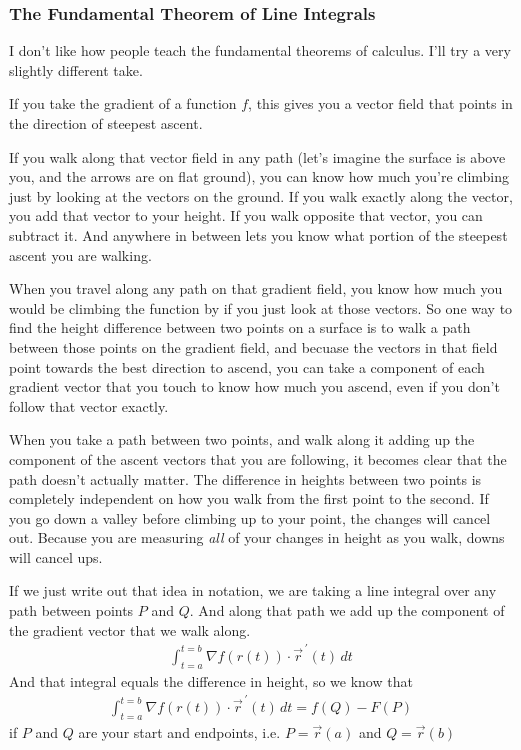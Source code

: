 \documentclass[12pt, letterpaper]{article}
\begin{document}
\subsubsection{The Fundamental Theorem of Line Integrals}
I don't like how people teach the fundamental theorems of calculus.
I'll try a very slightly different take.

If you take the gradient of a function $f$, this gives you a vector field that points in the direction of steepest ascent.

If you walk along that vector field in any path (let's imagine the surface is above you, and the arrows are on flat ground), you can know how much you're climbing just by looking at the vectors on the ground.
If you walk exactly along the vector, you add that vector to your height.
If you walk opposite that vector, you can subtract it.
And anywhere in between lets you know what portion of the steepest ascent you are walking.

When you travel along any path on that gradient field, you know how much you would be climbing the function by if you just look at those vectors.
So one way to find the height difference between two points on a surface is to walk a path between those points on the gradient field,
and becuase the vectors in that field point towards the best direction to ascend, you can take a component of each gradient vector that you touch to know how much you ascend,
even if you don't follow that vector exactly.

When you take a path between two points, and walk along it adding up the component of the ascent vectors that you are following, it becomes clear that the path doesn't actually matter.
The difference in heights between two points is completely independent on how you walk from the first point to the second.
If you go down a valley before climbing up to your point, the changes will cancel out.
Because you are measuring \emph{all} of your changes in height as you walk, downs will cancel ups.

If we just write out that idea in notation, we are taking a line integral over any path between points $P$ and $Q$.
And along that path we add up the component of the gradient vector that we walk along.
\begin{gather*}
    \int_{t=a}^{t=b} \nabla f(r(t)) \cdot \vec{r}^{\,\prime} (t) \, dt
\end{gather*}
And that integral equals the difference in height, so we know that 
\begin{gather*}
    \int_{t=a}^{t=b} \nabla f(r(t)) \cdot \vec{r}^{\,\prime} (t) \, dt = f(Q) - F(P)
\end{gather*}
if $P$ and $Q$ are your start and endpoints, i.e. $P = \vec{r}(a)$ and $Q = \vec{r}(b)$
\end{document}
